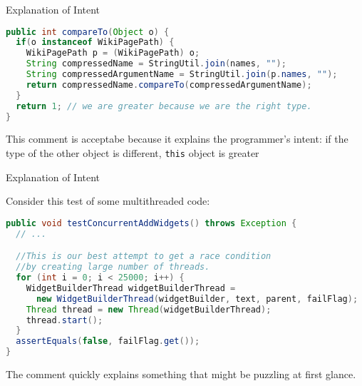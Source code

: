 \documentclass{beamer}
\begin{document}
\begin{frame}[fragile]{Explanation of Intent}


\begin{lstlisting}[language=Java]
public int compareTo(Object o) {
  if(o instanceof WikiPagePath) {
    WikiPagePath p = (WikiPagePath) o;
    String compressedName = StringUtil.join(names, "");
    String compressedArgumentName = StringUtil.join(p.names, "");
    return compressedName.compareTo(compressedArgumentName);
  }
  return 1; // we are greater because we are the right type.
}
\end{lstlisting}
This comment is acceptabe because it explains the programmer's intent: if the type of the other object is different, {\tt this} object is greater

\end{frame}

\begin{frame}[fragile]{Explanation of Intent}


Consider this test of some multithreaded code:
\begin{lstlisting}[language=Java]
public void testConcurrentAddWidgets() throws Exception {
  // ...

  //This is our best attempt to get a race condition
  //by creating large number of threads.
  for (int i = 0; i < 25000; i++) {
    WidgetBuilderThread widgetBuilderThread =
      new WidgetBuilderThread(widgetBuilder, text, parent, failFlag);
    Thread thread = new Thread(widgetBuilderThread);
    thread.start();
  }
  assertEquals(false, failFlag.get());
}
\end{lstlisting}
The comment quickly explains something that might be puzzling at first glance.

\end{frame}
\end{document}
